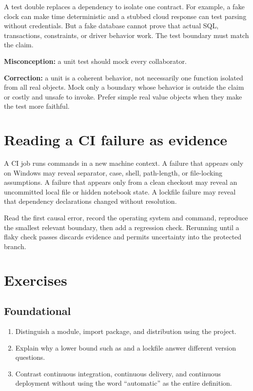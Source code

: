 A test double replaces a dependency to isolate one contract. For example, a
fake clock can make time deterministic and a stubbed cloud response can test
parsing without credentials. But a fake database cannot prove that actual SQL,
transactions, constraints, or driver behavior work. The test boundary must
match the claim.

\begin{misconceptionbox}
\textbf{Misconception:} a unit test should mock every collaborator.

\textbf{Correction:} a unit is a coherent behavior, not necessarily one
function isolated from all real objects. Mock only a boundary whose behavior is
outside the claim or costly and unsafe to invoke. Prefer simple real value
objects when they make the test more faithful.
\end{misconceptionbox}

\section{Reading a CI failure as evidence}

A CI job runs commands in a new machine context. A failure that appears only on
Windows may reveal separator, case, shell, path-length, or file-locking
assumptions. A failure that appears only from a clean checkout may reveal an
uncommitted local file or hidden notebook state. A lockfile failure may reveal
that dependency declarations changed without resolution.

Read the first causal error, record the operating system and command, reproduce
the smallest relevant boundary, then add a regression check. Rerunning until a
flaky check passes discards evidence and permits uncertainty into the protected
branch.


\section{Exercises}

\subsection*{Foundational}
\begin{enumerate}
  \item Distinguish a module, import package, and distribution using the
   project.
  \item Explain why a lower bound such as  and a lockfile answer
  different version questions.
  \item Contrast continuous integration, continuous delivery, and continuous
  deployment without using the word ``automatic'' as the entire definition.
\end{enumerate}

